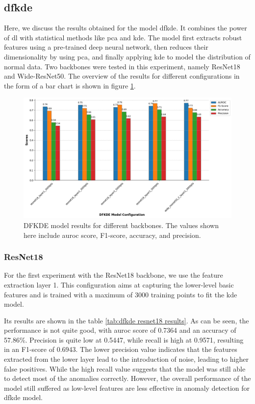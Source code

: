 \subsection*{\gls{dfkde}}

Here, we discuss the results obtained for the model \gls{dfkde}. It combines the power of \gls{dl} with statistical methods like \gls{pca} and \gls{kde}. The model first extracts robust features using a pre-trained deep neural network, then reduces their dimensionality by using \gls{pca}, and finally applying \gls{kde} to model the distribution of normal data. Two backbones were tested in this experiment, namely ResNet18 and Wide-ResNet50. The overview of the results for different configurations in the form of a bar chart is shown in figure \ref{fig:dfkde model results}.

\begin{figure}[ht!]
    \centering
    \includegraphics[width=1.2\linewidth]{Rohit_Master_Thesis//Images/dfkde_model_results.png}
    \caption{DFKDE model results for different backbones. The values shown here include \gls{auroc} score, F1-score, accuracy, and precision.}
    \label{fig:dfkde model results}
\end{figure}

\subsubsection*{ResNet18}

For the first experiment with the ResNet18 backbone, we use the feature extraction layer 1. This configuration aims at capturing the lower-level basic features and is trained with a maximum of 3000 training points to fit the \gls{kde} model.

Its results are shown in the table \ref{tab:dfkde resnet18 results}. As can be seen, the performance is not quite good, with \gls{auroc} score of 0.7364 and an accuracy of 57.86\%. Precision is quite low at 0.5447, while recall is high at 0.9571, resulting in an F1-score of 0.6943. The lower precision value indicates that the features extracted from the lower layer lead to the introduction of noise, leading to higher false positives. While the high recall value suggests that the model was still able to detect most of the anomalies correctly. However, the overall performance of the model still suffered as low-level features are less effective in anomaly detection for \gls{dfkde} model.

